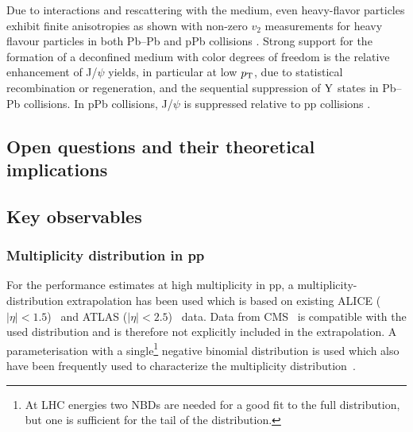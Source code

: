 \documentclass[../report.tex]{subfiles}
\begin{document}
Due to interactions and rescattering with the medium, even heavy-flavor particles exhibit finite anisotropies as shown with non-zero $v_{2}$ measurements for heavy flavour particles in both Pb--Pb and pPb collisions \cite{ALICE:2013xna,Abelev:2013lca,Abelev:2014ipa,Adam:2015pga,Acharya:2017tfn,Adam:2016ssk,ALICE:2016clc,Acharya:2017qps,Sirunyan:2017plt,Acharya:2017tgv,Khachatryan:2016ypw,Acharya:2018dxy,Sirunyan:2018toe}. Strong support for the formation of a deconfined medium with color degrees of freedom is the relative enhancement of J/$\psi$ yields, in particular at low $p_{\rm{T}}$, due to statistical recombination or regeneration, and the sequential suppression of $\rm{Y}$ states in Pb--Pb collisions. In pPb collisions, J/$\psi$ is suppressed relative to pp collisions \cite{Abelev:2012rv,Adam:2015rba,Chatrchyan:2012lxa, Chatrchyan:2013nza, Abelev:2014zpa, Adam:2015jsa, Adam:2016ohd, Adam:2015rta, Adam:2015isa, Adam:2015gba, Adam:2016rdg, Adamova:2017uhu, Acharya:2017tfn, Acharya:2017hjh, Sirunyan:2017lzi, Khachatryan:2016ypw, Sirunyan:2017mzd, Sirunyan:2017isk, Khachatryan:2016xxp, Sirunyan:2016znt, Aaboud:2017cif, Aaij:2017cqq}. 

\subsection{Open questions and their theoretical implications}


\subsection{Key observables}

\subsubsection{Multiplicity distribution in pp}

For the performance estimates at high multiplicity in pp, a multiplicity-distribution extrapolation has been used which is based on existing ALICE ($|\eta| < 1.5$)~\cite{Adam:2015gka} and ATLAS ($|\eta|< 2.5$)~\cite{Aad:2010ac,Aad:2016xww} data. Data from CMS~\cite{Khachatryan:2010nk} is compatible with the used distribution and is therefore not explicitly included in the extrapolation. A parameterisation with a single\footnote{At LHC energies two NBDs are needed for a good fit to the full distribution, but one is sufficient for the tail of the distribution.} negative binomial distribution is used which also have been frequently used to characterize the multiplicity distribution~\cite{GrosseOetringhaus:2009kz,ALICE:2017pcy}.
\end{document}
